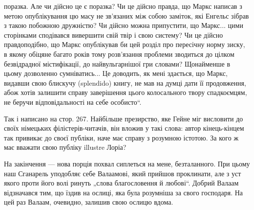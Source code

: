 поразка. Але чи дійсно це є поразка? Чи це дійсно правда, що Маркс написав з метою опублікування цю масу не зв’язаних між
собою заміток, які Енгельс зібрав з такою побожною дружністю? Чи дійсно можна припустити, що Маркс... цими сторінками
сподівався вивершити свій твір і свою систему? Чи це дійсно правдоподібно, що Маркс опублікував би цей розділ про
пересічну норму зиску, в якому обіцяне багато років тому розв’язання проблеми зводиться до цілком безвідрадної
містифікації, до найвульгарнішої гри словами? Щонайменше в цьому дозволенно сумніватись... Це доводить, як мені
здається, що Маркс,
видавши свою блискучу (splendido) книгу, не мав на думці дати її продовження, абож хотів залишити справу
заверішення цього колосального твору спадкоємцям, не беручи відповідальності на себе особисто“.

Так і написано на стор. 267. Найбільше презирство, яке Гейне міг висловити до своїх німецьких філістерів-читачів, він вложив
у такі слова: автор кінець-кінцем так привикає до своєї публіки, наче має справу з розумною істотою. За кого ж має вважати
свою публіку illustre Лоріа?

На закінчення — нова порція похвал сиплеться на мене, безталанного. При цьому наш Сганарель уподобляє себе Валаамові, який
прийшов проклинати, але з уст якого проти його волі ринуть „слова благословення й любові“. Добрий Валаам відзначався тим, що
їздив на ослиці, яка була розумніша за свого господаря. На цей раз Валаам, очевидно, залишив свою ослицю вдома.
\parbreak{}  %

